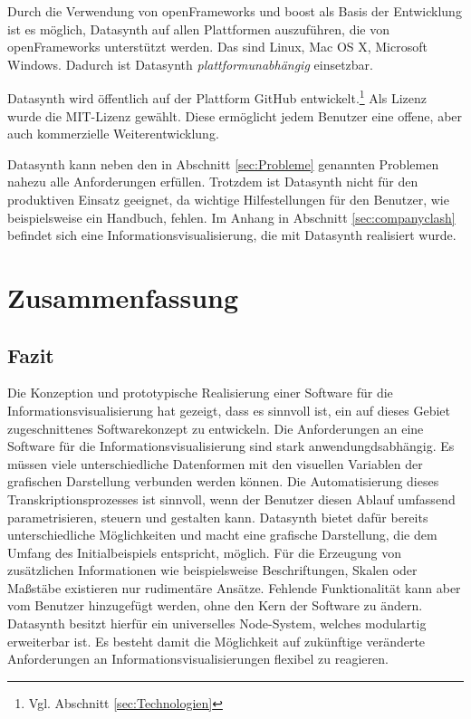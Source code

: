 \documentclass[a4paper, 
               12pt,
               DIV=calc,
               version=first,
               pdftex,
               headsepline,
               footsepline,
               bibtotocnumbered,
               liststotocnumbered]{scrreprt}
\begin{document}
Durch die Verwendung von openFrameworks und boost als Basis der Entwicklung
ist es möglich, Datasynth auf allen Plattformen auszuführen, die von openFrameworks
unterstützt werden. Das sind Linux, Mac OS X, Microsoft Windows.
Dadurch ist Datasynth \textit{plattformunabhängig} einsetzbar.

Datasynth wird öffentlich auf der Plattform GitHub entwickelt.\footnote{Vgl.
Abschnitt \ref{sec:Technologien}} Als Lizenz wurde die MIT-Lizenz gewählt.
Diese ermöglicht jedem Benutzer eine offene, aber auch kommerzielle Weiterentwicklung.

Datasynth kann neben den in Abschnitt \ref{sec:Probleme} genannten Problemen nahezu alle Anforderungen erfüllen.
Trotzdem ist Datasynth nicht für den produktiven Einsatz geeignet, da wichtige Hilfestellungen für den
Benutzer, wie beispielsweise ein Handbuch, fehlen. Im Anhang in Abschnitt
\ref{sec:companyclash} befindet sich eine Informationsvisualisierung, die mit
Datasynth realisiert wurde.

\chapter{Zusammenfassung}
\label{cha:Zusammenfassung}
\section{Fazit}
\label{sec:Fazit}
Die Konzeption und prototypische Realisierung einer Software für die
Informationsvisualisierung hat gezeigt, dass es sinnvoll ist,
ein auf dieses Gebiet zugeschnittenes Softwarekonzept zu entwickeln.
Die Anforderungen an eine Software für die Informationsvisualisierung sind stark
anwendungdsabhängig. Es müssen viele unterschiedliche Datenformen
mit den visuellen Variablen der grafischen Darstellung verbunden werden können.
Die Automatisierung dieses Transkriptionsprozesses ist sinnvoll,
wenn der Benutzer diesen Ablauf umfassend parametrisieren, steuern und gestalten kann.
Datasynth bietet dafür bereits unterschiedliche Möglichkeiten und
macht eine grafische Darstellung, die dem Umfang des Initialbeispiels
entspricht, möglich. Für die Erzeugung von zusätzlichen Informationen
wie beispielsweise Beschriftungen, Skalen oder
Maßstäbe existieren nur rudimentäre Ansätze.
Fehlende Funktionalität kann aber vom Benutzer hinzugefügt werden, ohne
den Kern der Software zu ändern. Datasynth besitzt hierfür ein universelles
Node-System, welches modulartig erweiterbar ist. Es besteht
damit die Möglichkeit auf zukünftige veränderte Anforderungen an
Informationsvisualisierungen flexibel zu reagieren.
\end{document}
